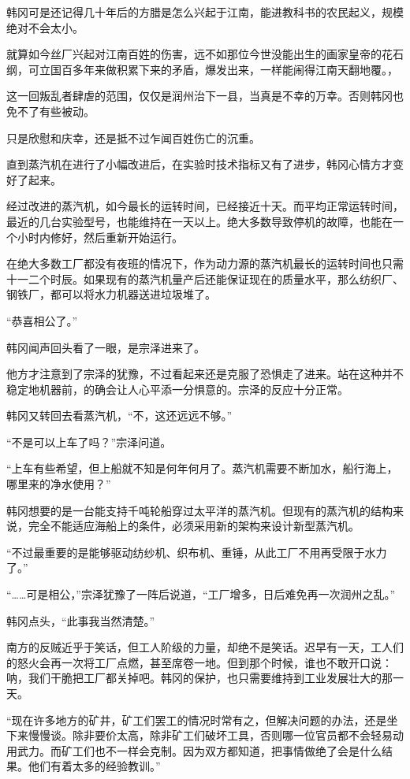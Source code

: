 韩冈可是还记得几十年后的方腊是怎么兴起于江南，能进教科书的农民起义，规模绝对不会太小。

就算如今丝厂兴起对江南百姓的伤害，远不如那位今世没能出生的画家皇帝的花石纲，可立国百多年来做积累下来的矛盾，爆发出来，一样能闹得江南天翻地覆。，

这一回叛乱者肆虐的范围，仅仅是润州治下一县，当真是不幸的万幸。否则韩冈也免不了有些被动。

只是欣慰和庆幸，还是抵不过乍闻百姓伤亡的沉重。

直到蒸汽机在进行了小幅改进后，在实验时技术指标又有了进步，韩冈心情方才变好了起来。

经过改进的蒸汽机，如今最长的运转时间，已经接近十天。而平均正常运转时间，最近的几台实验型号，也能维持在一天以上。绝大多数导致停机的故障，也能在一个小时内修好，然后重新开始运行。

在绝大多数工厂都没有夜班的情况下，作为动力源的蒸汽机最长的运转时间也只需十一二个时辰。如果现有的蒸汽机量产后还能保证现在的质量水平，那么纺织厂、钢铁厂，都可以将水力机器送进垃圾堆了。

“恭喜相公了。”

韩冈闻声回头看了一眼，是宗泽进来了。

他方才注意到了宗泽的犹豫，不过看起来还是克服了恐惧走了进来。站在这种并不稳定地机器前，的确会让人心平添一分惧意的。宗泽的反应十分正常。

韩冈又转回去看蒸汽机，“不，这还远远不够。”

“不是可以上车了吗？”宗泽问道。

“上车有些希望，但上船就不知是何年何月了。蒸汽机需要不断加水，船行海上，哪里来的净水使用？”

韩冈想要的是一台能支持千吨轮船穿过太平洋的蒸汽机。但现有的蒸汽机的结构来说，完全不能适应海船上的条件，必须采用新的架构来设计新型蒸汽机。

“不过最重要的是能够驱动纺纱机、织布机、重锤，从此工厂不用再受限于水力了。”

“……可是相公，”宗泽犹豫了一阵后说道，“工厂增多，日后难免再一次润州之乱。”

韩冈点头，“此事我当然清楚。”

南方的反贼近乎于笑话，但工人阶级的力量，却绝不是笑话。迟早有一天，工人们的怒火会再一次将工厂点燃，甚至席卷一地。但到那个时候，谁也不敢开口说：呐，我们干脆把工厂都关掉吧。韩冈的保护，也只需要维持到工业发展壮大的那一天。

“现在许多地方的矿井，矿工们罢工的情况时常有之，但解决问题的办法，还是坐下来慢慢谈。除非要价太高，除非矿工们破坏工具，否则哪一位官员都不会轻易动用武力。而矿工们也不一样会克制。因为双方都知道，把事情做绝了会是什么结果。他们有着太多的经验教训。”

